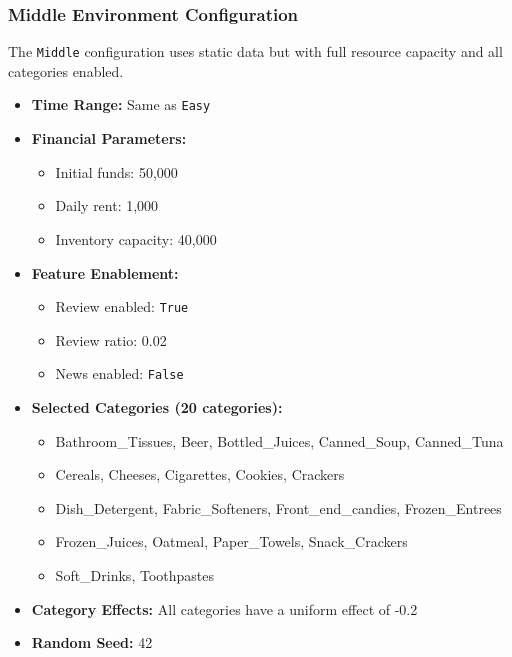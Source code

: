 \subsubsection{Middle Environment Configuration}

The \texttt{Middle} configuration uses static data but with full resource capacity and all categories enabled.

\begin{itemize}
    \item \textbf{Time Range:} Same as \texttt{Easy}
    
    \item \textbf{Financial Parameters:}
    \begin{itemize}
        \item Initial funds: 50,000
        \item Daily rent: 1,000
        \item Inventory capacity: 40,000
    \end{itemize}
    
    \item \textbf{Feature Enablement:}
    \begin{itemize}
        \item Review enabled: \texttt{True}
        \item Review ratio: 0.02
        \item News enabled: \texttt{False}
    \end{itemize}
    
    \item \textbf{Selected Categories (20 categories):}
    \begin{itemize}
        \item Bathroom\_Tissues, Beer, Bottled\_Juices, Canned\_Soup, Canned\_Tuna
        \item Cereals, Cheeses, Cigarettes, Cookies, Crackers
        \item Dish\_Detergent, Fabric\_Softeners, Front\_end\_candies, Frozen\_Entrees
        \item Frozen\_Juices, Oatmeal, Paper\_Towels, Snack\_Crackers
        \item Soft\_Drinks, Toothpastes
    \end{itemize}
    
    \item \textbf{Category Effects:} All categories have a uniform effect of -0.2
    
    \item \textbf{Random Seed:} 42
\end{itemize}

